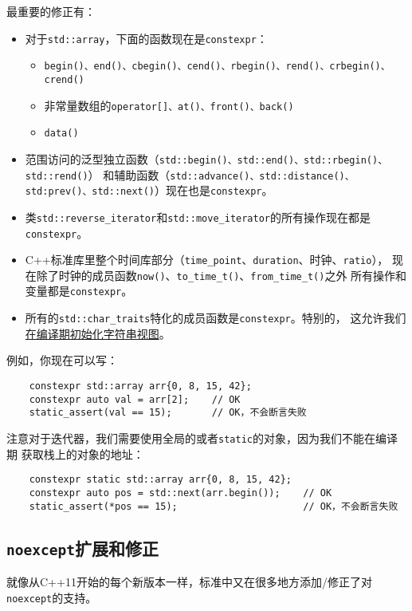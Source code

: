 最重要的修正有：
\begin{itemize}
    \item 对于\texttt{std::array}，下面的函数现在是\texttt{constexpr}：
    \begin{itemize}
        \item \texttt{begin()、end()、cbegin()、cend()、rbegin()、rend()、crbegin()、crend()}
        \item 非常量数组的\texttt{operator[]、at()、front()、back()}
        \item \texttt{data()}
    \end{itemize}
    \item 范围访问的泛型独立函数（\texttt{std::begin()、std::end()、std::rbegin()、std::rend()}）
    和辅助函数（\texttt{std::advance()、std::distance()、std:prev()、std::next()}）现在也是\texttt{constexpr}。
    \item 类\texttt{std::reverse\_iterator}和\texttt{std::move\_iterator}的所有操作现在都是\texttt{constexpr}。
    \item C++标准库里整个时间库部分（\texttt{time\_point}、\texttt{duration}、时钟、\texttt{ratio}），
    现在除了时钟的成员函数\texttt{now()}、\texttt{to\_time\_t()}、\texttt{from\_time\_t()}之外
    所有操作和变量都是\texttt{constexpr}。
    \item 所有的\texttt{std::char\_traits}特化的成员函数是\texttt{constexpr}。特别的，
    这允许我们\hyperref[编译期字符串视图]{在编译期初始化字符串视图}。
\end{itemize}
例如，你现在可以写：
\begin{lstlisting}
    constexpr std::array arr{0, 8, 15, 42};
    constexpr auto val = arr[2];    // OK
    static_assert(val == 15);       // OK，不会断言失败
\end{lstlisting}
注意对于迭代器，我们需要使用全局的或者\texttt{static}的对象，因为我们不能在编译期
获取栈上的对象的地址：
\begin{lstlisting}
    constexpr static std::array arr{0, 8, 15, 42};
    constexpr auto pos = std::next(arr.begin());    // OK
    static_assert(*pos == 15);                      // OK，不会断言失败
\end{lstlisting}

\subsection{\texttt{noexcept}扩展和修正}
就像从C++11开始的每个新版本一样，标准中又在很多地方添加/修正了对\texttt{noexcept}的支持。

